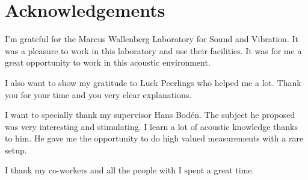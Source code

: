 \section*{Acknowledgements}
\setlength{\parindent}{20pt}
I'm grateful for the Marcus Wallenberg Laboratory for Sound and Vibration. It was a pleasure to work in this laboratory and use their facilities. It was for me a great opportunity to work in this acoustic environment.

I also want to show my gratitude to Luck Peerlings who helped me a lot. Thank you for your time and you very clear explanations. 

I want to specially thank my supervisor Hans Bodén. The subject he proposed was very interesting and stimulating. I learn a lot of acoustic knowledge thanks to him. He gave me the opportunity to do high valued measurements with a rare setup.

I thank my co-workers and all the people with I spent a great time. 

\clearpage